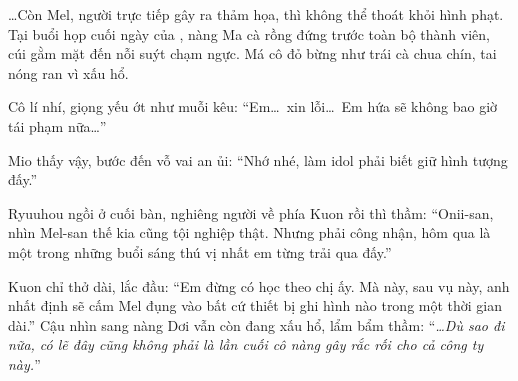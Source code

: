 \documentclass[../main.tex]{subfiles}
\begin{document}
\dots Còn Mel, người trực tiếp gây ra thảm họa, thì không thể thoát khỏi hình phạt. Tại buổi họp cuối ngày của \hll, nàng Ma cà rồng đứng trước toàn bộ thành viên, cúi gằm mặt đến nỗi suýt chạm ngực. Má cô đỏ bừng như trái cà chua chín, tai nóng ran vì xấu hổ.

Cô lí nhí, giọng yếu ớt như muỗi kêu: ``Em\dots\ xin lỗi\dots\ Em hứa sẽ không bao giờ tái phạm nữa\dots''

Mio thấy vậy, bước đến vỗ vai an ủi: ``Nhớ nhé, làm idol phải biết giữ hình tượng đấy.''

Ryuuhou ngồi ở cuối bàn, nghiêng người về phía Kuon rồi thì thầm: ``Onii-san, nhìn Mel-san thế kia cũng tội nghiệp thật. Nhưng phải công nhận, hôm qua là một trong những buổi sáng thú vị nhất em từng trải qua đấy.''

Kuon chỉ thở dài, lắc đầu: ``Em đừng có học theo chị ấy. Mà này, sau vụ này, anh nhất định sẽ cấm Mel đụng vào bất cứ thiết bị ghi hình nào trong một thời gian dài.'' Cậu nhìn sang nàng Dơi vẫn còn đang xấu hổ, lẩm bẩm thầm: ``\textit{\dots Dù sao đi nữa, có lẽ đây cũng không phải là lần cuối cô nàng gây rắc rối cho cả công ty này.}''
\end{document}
